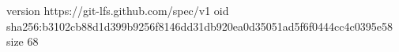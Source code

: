 version https://git-lfs.github.com/spec/v1
oid sha256:b3102cb88d1d399b9256f8146dd31db920ea0d35051ad5f6f0444cc4c0395e58
size 68
